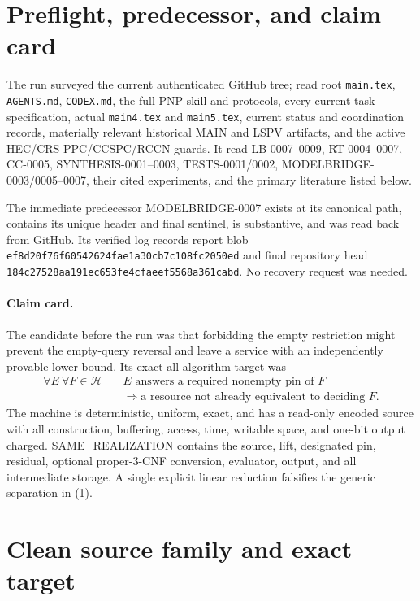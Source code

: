 \documentclass[11pt]{article}
\begin{document}
\section{Preflight, predecessor, and claim card}

The run surveyed the current authenticated GitHub tree; read root
\texttt{main.tex}, \texttt{AGENTS.md}, \texttt{CODEX.md}, the full PNP skill
and protocols, every current task specification, actual \texttt{main4.tex}
and \texttt{main5.tex}, current status and coordination records, materially
relevant historical MAIN and LSPV artifacts, and the active
HEC/CRS-PPC/CCSPC/RCCN guards.  It read LB-0007--0009, RT-0004--0007,
CC-0005, SYNTHESIS-0001--0003, TESTS-0001/0002, MODELBRIDGE-0003/0005--0007,
their cited experiments, and the primary literature listed below.

The immediate predecessor MODELBRIDGE-0007 exists at its canonical path,
contains its unique header and final sentinel, is substantive, and was read
back from GitHub.  Its verified log records report blob
\texttt{ef8d20f76f60542624fae1a30cb7c108fc2050ed} and final repository head
\texttt{184c27528aa191ec653fe4cfaeef5568a361cabd}.  No recovery request was
needed.

\paragraph{Claim card.}
The candidate before the run was that forbidding the empty restriction might
prevent the empty-query reversal and leave a service with an independently
provable lower bound.  Its exact all-algorithm target was
\[
 \begin{aligned}
 \forall E\ \forall F\in\mathcal H\quad
 &E\text{ answers a required nonempty pin of }F\\
 &\Longrightarrow
 \text{a resource not already equivalent to deciding }F.
 \end{aligned}                                                   \tag{1}
\]
The machine is deterministic, uniform, exact, and has a read-only encoded
source with all construction, buffering, access, time, writable space, and
one-bit output charged.  SAME\_REALIZATION contains the source, lift,
designated pin, residual, optional proper-3-CNF conversion, evaluator, output,
and all intermediate storage.  A single explicit linear reduction falsifies
the generic separation in (1).

\section{Clean source family and exact target}
\end{document}

